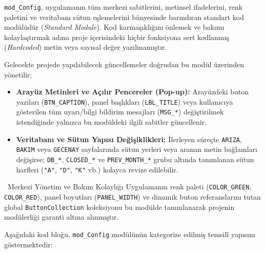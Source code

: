 \texttt{mod\_Config}, uygulamanın tüm merkezi sabitlerini, metinsel ifadelerini, renk paletini ve veritabanı sütun eşlemelerini bünyesinde barındıran standart kod modülüdür (\textit{Standard Module}). Kod karmaşıklığını önlemek ve bakımı kolaylaştırmak adına proje içerisindeki hiçbir fonksiyona sert kodlanmış (\textit{Hardcoded}) metin veya sayısal değer yazılmamıştır.

Gelecekte projede yapılabilecek güncellemeler doğrudan bu modül üzerinden yönetilir:

\begin{itemize}\setlength{\itemsep}{0pt}\setlength{\parskip}{1pt}
    \item \textbf{Arayüz Metinleri ve Açılır Pencereler (Pop-up):} Arayüzdeki buton yazıları (\texttt{BTN\_CAPTION}), panel başlıkları (\texttt{LBL\_TITLE}) veya kullanıcıya gösterilen tüm uyarı/bilgi bildirim mesajları (\texttt{MSG\_*}) değiştirilmek istendiğinde yalnızca bu modüldeki ilgili sabitler güncellenir.
    \item \textbf{Veritabanı ve Sütun Yapısı Değişiklikleri:} İlerleyen süreçte \texttt{ARIZA}, \texttt{BAKIM} veya \texttt{GECENAY} sayfalarında sütun yerleri veya aranan metin bağlamları değişirse; \texttt{DB\_*}, \texttt{CLOSED\_*} ve \texttt{PREV\_MONTH\_*} grubu altında tanımlanan sütun harfleri (\texttt{"A"}, \texttt{"D"}, \texttt{"K"} vb.) kolayca revize edilebilir.
\end{itemize}

\vspace{0.15cm}

\begin{infobox}{\faCogs\ Merkezi Yönetim ve Bakım Kolaylığı}
Uygulamanın renk paleti (\texttt{COLOR\_GREEN}, \texttt{COLOR\_RED}), panel boyutları (\texttt{PANEL\_WIDTH}) ve dinamik buton referanslarını tutan global \texttt{ButtonCollection} koleksiyonu bu modülde tanımlanarak projenin modülerliği garanti altına alınmıştır.
\end{infobox}

\vspace{0.15cm}

Aşağıdaki kod bloğu, \texttt{mod\_Config} modülünün kategorize edilmiş temsilî yapısını göstermektedir:

